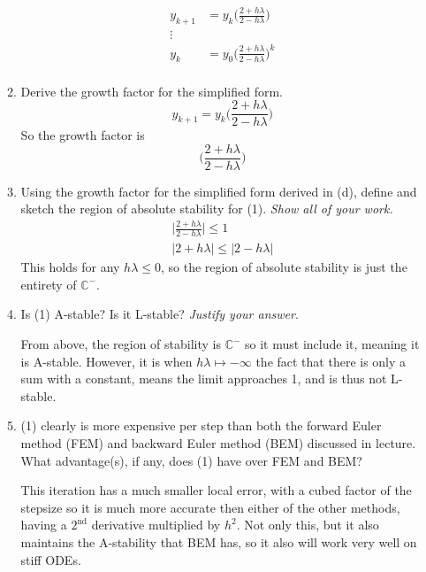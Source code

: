 \documentclass{article}
\begin{document}
\begin{enumerate}
\begin{enumerate}
\begin{align*}
                y_{k+1} &= y_k \bigg( \frac{2 + h\lambda}
                {2-h\lambda}\bigg) \\
                \vdots \\
                y_{k} &= y_0 \bigg( \frac{2 + h\lambda}
                {2-h\lambda}\bigg)^k \\
                \end{align*}
            \item Derive the growth factor for the simplified form.
                \[y_{k+1} = y_k \bigg( \frac{2 + h\lambda} 
                {2-h\lambda}\bigg) \]
                So the growth factor is 
                \[ \bigg(  \frac{2 + h \lambda}{2-h\lambda} \bigg) \]
            \item Using the growth factor for the simplified form derived
                in (d), define and sketch the region of absolute stability
                for (1). \textit{Show all of your work.}
                \begin{align*}
                    \bigg| \frac{2 + h \lambda}{2-h\lambda} \bigg| \leq 1 \\
                    |2 + h \lambda| \leq |2-h\lambda|
                \end{align*}
                This holds for any $h\lambda \leq 0$, so the region of
                absolute stability is just the entirety of $\mathbb{C}^-$.

            \item Is (1) A-stable? Is it L-stable? \textit{Justify your 
                answer}.

                From above, the region of stability is $\mathbb{C}^-$ so it
                must include it, meaning it is A-stable. However, it is
                when $h\lambda \mapsto -\infty$ the fact that there is only
                a sum with a constant, means the limit approaches 1, and
                is thus not L-stable.
            \item (1) clearly is more expensive per step than both the
                forward Euler method (FEM) and backward Euler method
                (BEM) discussed in lecture. What advantage(s), if any,
                does (1) have over FEM and BEM?
                
                This iteration has a much smaller local error, with a 
                cubed factor of the stepsize so it is much more accurate
                then either of the other methods, having a $2^{\text{nd}}$
                derivative multiplied by $h^2$. Not only this, but it also
                maintains the A-stability that BEM has, so it also will
                work very well on stiff ODEs.
        \end{enumerate}
\end{enumerate}
\end{document}
